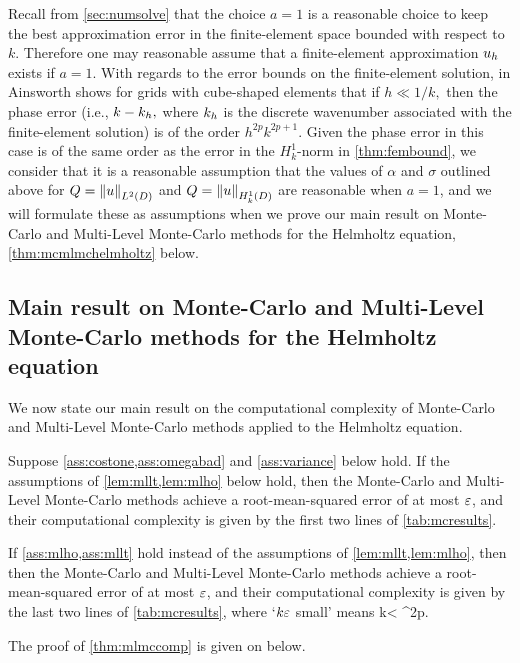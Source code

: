 Recall from \cref{sec:numsolve} that the choice $a=1$ is a reasonable choice to keep the best approximation error in the finite-element space bounded with respect to $k$. Therefore one may reasonable assume that a finite-element approximation $u_{h}$ exists if $a=1.$ With regards to the error bounds on the finite-element solution, in \cite[Theorem 3.2]{Ai:04} Ainsworth shows for grids with cube-shaped elements that if $h \ll 1/k,$ then the phase error (i.e., $k-k_{h},$ where $k_{h}$ is the discrete wavenumber associated with the finite-element solution) is of the order $h^{2p}k^{2p+1}$. Given the phase error in this case is of the same order as the error in the $H^1_k$-norm in \cref{thm:fembound}, we consider that it is a reasonable assumption that the values of $\alpha$ and $\sigma$ outlined above for $Q=\NLtD{u}$ and $Q=\NHokD{u}$ are reasonable when $a=1$, and we will formulate these as assumptions when we prove our main result on Monte-Carlo and Multi-Level Monte-Carlo methods for the Helmholtz equation, \cref{thm:mcmlmchelmholtz} below.

\subsection{Main result on Monte-Carlo and Multi-Level Monte-Carlo methods for the Helmholtz equation}
We now state our main result on the computational complexity of Monte-Carlo and Multi-Level Monte-Carlo methods applied to the Helmholtz equation.

\label{thm:mcmlmchelmholtz}
Suppose \cref{ass:costone,ass:omegabad} and \cref{ass:variance} below hold. If the assumptions of \cref{lem:mllt,lem:mlho} below hold, then the Monte-Carlo and Multi-Level Monte-Carlo methods achieve a root-mean-squared error of at most $\varepsilon$, and their computational complexity is given by  the first two lines of \cref{tab:mcresults}.

If \cref{ass:mlho,ass:mllt} hold instead of the assumptions of \cref{lem:mllt,lem:mlho}, then then the Monte-Carlo and Multi-Level Monte-Carlo methods achieve a root-mean-squared error of at most $\varepsilon$, and their computational complexity is given by the last two lines of \cref{tab:mcresults}, where `$k\varepsilon$ small' means
\beq\label{eq:kepscond}
k\eps < \co \Ccoarse^{2p}.
\eeq
\enth

The proof of \cref{thm:mlmccomp} is given on  below.

